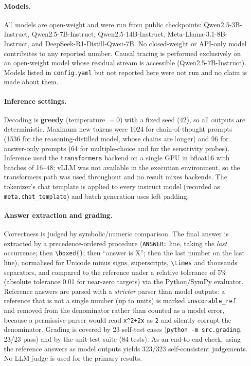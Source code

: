 \paragraph{Models.}
All models are open-weight and were run from public checkpoints:
Qwen2.5-3B-Instruct, Qwen2.5-7B-Instruct, Qwen2.5-14B-Instruct,
Meta-Llama-3.1-8B-Instruct, and DeepSeek-R1-Distill-Qwen-7B. No closed-weight or
API-only model contributes to any reported number. Causal tracing is performed
exclusively on an open-weight model whose residual stream is accessible
(Qwen2.5-7B-Instruct). Models listed in \texttt{config.yaml} but not reported
here were not run and no claim is made about them.

\paragraph{Inference settings.}
Decoding is \textbf{greedy} (temperature $=0$) with a fixed seed (42), so all
outputs are deterministic. Maximum new tokens were 1024 for chain-of-thought
prompts (1536 for the reasoning-distilled model, whose chains are longer) and
96 for answer-only prompts (64 for multiple-choice and for the sensitivity
probes). Inference used the \texttt{transformers} backend on a single GPU in
bfloat16 with batches of 16--48; vLLM was not available in the execution
environment, so the transformers path was used throughout and no result mixes
backends. The tokenizer's chat template is applied to every instruct model
(recorded as \texttt{meta.chat\_template}) and batch generation uses left
padding.

\paragraph{Answer extraction and grading.}
Correctness is judged by symbolic/numeric comparison. The final answer is
extracted by a precedence-ordered procedure (\texttt{ANSWER:} line, taking the
\emph{last} occurrence; then \texttt{\textbackslash boxed\{\}}; then
``answer is X''; then the last number on the last line), normalised for Unicode
minus signs, superscripts, \texttt{\textbackslash times} and thousands
separators, and compared to the reference under a relative tolerance of 5\%
(absolute tolerance 0.01 for near-zero targets) via the Python/SymPy evaluator.
Reference answers are parsed with a \emph{stricter} parser than model outputs:
a reference that is not a single number (up to units) is marked
\texttt{unscorable\_ref} and removed from the denominator rather than counted
as a model error, because a permissive parser would read
\texttt{x\^{}2+2x} as \texttt{2} and silently corrupt the denominator.
Grading is covered by 23 self-test cases (\texttt{python -m src.grading},
23/23 pass) and by the unit-test suite (84 tests). As an end-to-end check, using
the reference answers as model outputs yields 323/323 self-consistent
judgements. No LLM judge is used for the primary results.

